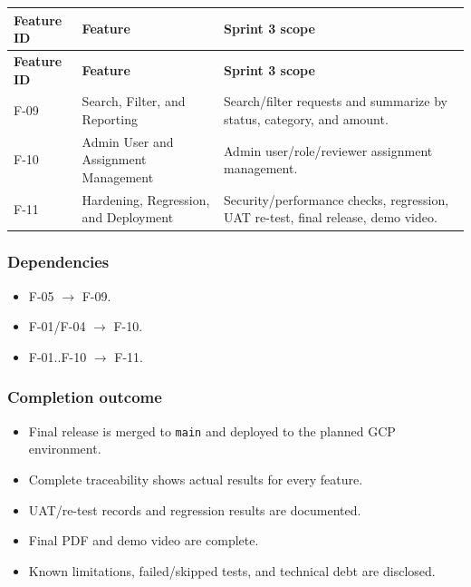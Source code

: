 \documentclass[11pt,a4paper]{article}
\begin{document}
\vspace{0.3em}
\begin{longtable}{|>{\RaggedRight}p{3.0cm}|>{\RaggedRight}p{6.8cm}|>{\RaggedRight}p{5.2cm}|}
\hline
\rowcolor{zenPale}\textbf{Feature ID} & \textbf{Feature} & \textbf{Sprint 3 scope} \\ \hline
\endfirsthead
\hline
\rowcolor{zenPale}\textbf{Feature ID} & \textbf{Feature} & \textbf{Sprint 3 scope} \\ \hline
\endhead
\hline
\endfoot
F-09 & Search, Filter, and Reporting & Search/filter requests and summarize by status, category, and amount. \\ \hline
F-10 & Admin User and Assignment Management & Admin user/role/reviewer assignment management. \\ \hline
F-11 & Hardening, Regression, and Deployment & Security/performance checks, regression, UAT re-test, final release, demo video. \\ \hline
\end{longtable}
\vspace{0.3em}

\subsubsection{Dependencies}

\begin{itemize}[leftmargin=*,itemsep=2pt,topsep=2pt]
  \item F-05 $\rightarrow$ F-09.
  \item F-01/F-04 $\rightarrow$ F-10.
  \item F-01..F-10 $\rightarrow$ F-11.
\end{itemize}
\subsubsection{Completion outcome}

\begin{itemize}[leftmargin=*,itemsep=2pt,topsep=2pt]
  \item Final release is merged to \texttt{main} and deployed to the planned GCP environment.
  \item Complete traceability shows actual results for every feature.
  \item UAT/re-test records and regression results are documented.
  \item Final PDF and demo video are complete.
  \item Known limitations, failed/skipped tests, and technical debt are disclosed.
\end{itemize}
\end{document}
